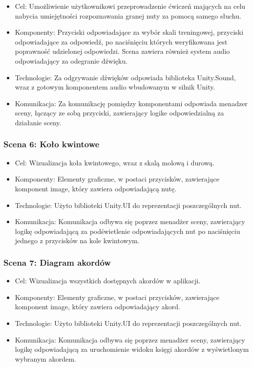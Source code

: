 \begin{itemize}
\item Cel: Umożliwienie użytkownikowi przeprowadzenie ćwiczeń mających na celu nabycia umiejętności rozpoznawania granej nuty za pomocą samego słuchu.
\item Komponenty: Przyciski odpowiadające za wybór skali treningowej, przyciski odpowiadające za odpowiedź, po naciśnięciu których weryfikowana jest poprawność udzielonej odpowiedzi. Scena zawiera również system audio odpowiadający za odegranie dźwięku.
\item Technologie: Za odgrywanie dźwięków odpowiada biblioteka Unity.Sound, wraz z gotowym komponentem audio wbudowanym w silnik Unity.
\item Komunikacja: Za komunikację pomiędzy komponentami odpowiada menadzer sceny, łączący ze sobą przyciski, zawierający logike odpowiedzialną za działanie sceny.
\end{itemize}

\subsubsection{Scena 6: Koło kwintowe}

\begin{itemize}
	\item Cel: Wizualizacja koła kwintowego, wraz z skalą molową i durową.
	\item Komponenty: Elementy graficzne, w postaci przycisków, zawierające komponent image, który zawiera odpowiadającą nutę.
	\item Technologie: Użyto biblioteki Unity.UI do reprezentacji poszczególnych nut.
	\item Komunikacja: Komunikacja odbywa się poprzez menadżer sceny, zawierający logikę odpowiadającą za podświetlenie odpowiadających nut po naciśnięciu jednego z przycisków na kole kwintowym.
\end{itemize}

\subsubsection{Scena 7: Diagram akordów}

\begin{itemize}
	\item Cel: Wizualizacja wszystkich dostępnych akordów w aplikacji.
	\item Komponenty: Elementy graficzne, w postaci przycisków, zawierające komponent image, który zawiera odpowiadający akord.
	\item Technologie: Użyto biblioteki Unity.UI do reprezentacji poszczególnych nut.
	\item Komunikacja: Komunikacja odbywa się poprzez menadżer sceny, zawierający logikę odpowiadającą za uruchomienie widoku księgi akordów z wyświetlonym wybranym akordem.
\end{itemize}

